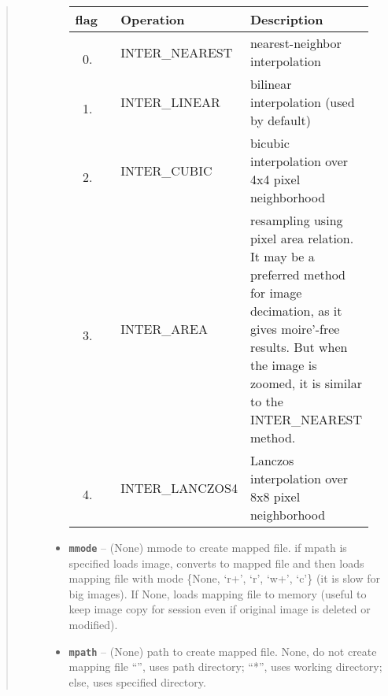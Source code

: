 \documentclass[letterpaper,10pt,english]{sphinxmanual}
\begin{document}
\begin{fulllineitems}
\begin{quote}
\begin{description}
\begin{itemize}
\begin{tabular}{|p{0.317\linewidth}|p{0.317\linewidth}|p{0.317\linewidth}|}
\hline
\textsf{\relax 
flag
} & \textsf{\relax 
Operation
} & \textsf{\relax 
Description
}\\
\hline\begin{enumerate}
\setcounter{enumi}{-1}
\item {} 
\end{enumerate}
 & 
INTER\_NEAREST
 & 
nearest-neighbor interpolation
\\
\hline\begin{enumerate}
\item {} 
\end{enumerate}
 & 
INTER\_LINEAR
 & 
bilinear interpolation (used by default)
\\
\hline\begin{enumerate}
\setcounter{enumi}{1}
\item {} 
\end{enumerate}
 & 
INTER\_CUBIC
 & 
bicubic interpolation over 4x4 pixel neighborhood
\\
\hline\begin{enumerate}
\setcounter{enumi}{2}
\item {} 
\end{enumerate}
 & 
INTER\_AREA
 & 
resampling using pixel area relation.
It may be a preferred method for image decimation,
as it gives moire’-free results. But when the image
is zoomed, it is similar to the INTER\_NEAREST method.
\\
\hline\begin{enumerate}
\setcounter{enumi}{3}
\item {} 
\end{enumerate}
 & 
INTER\_LANCZOS4
 & 
Lanczos interpolation over 8x8 pixel neighborhood
\\
\hline\end{tabular}



\item {} 
\textbf{\texttt{mmode}} -- (None) mmode to create mapped file. if mpath is specified loads image, converts
to mapped file and then loads mapping file with mode \{None, `r+', `r', `w+', `c'\}
(it is slow for big images). If None, loads mapping file to memory (useful to keep
image copy for session even if original image is deleted or modified).

\item {} 
\textbf{\texttt{mpath}} -- (None) path to create mapped file.
None, do not create mapping file
``'', uses path directory;
``*'', uses working directory;
else, uses specified directory.


\end{itemize}
\end{description}
\end{quote}
\end{fulllineitems}
\end{document}

